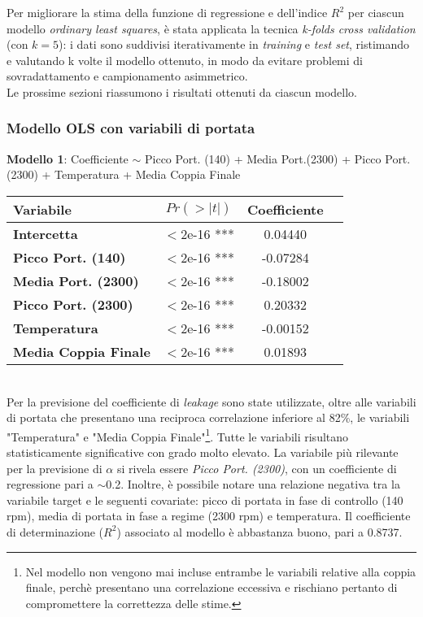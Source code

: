 \documentclass[fleqn,10pt]{SelfArx} %
\begin{document}
Per migliorare la stima della funzione di regressione e dell'indice $R^2$ per ciascun modello \textit{ordinary least squares}, è stata applicata la tecnica \textit{k-folds cross validation} (con $k=5$): i dati sono suddivisi iterativamente in \textit{training} e \textit{test set}, ristimando e valutando k volte il modello ottenuto, in modo da evitare problemi di sovradattamento e campionamento asimmetrico.\\
Le prossime sezioni riassumono i risultati ottenuti da ciascun modello.
\subsubsection{Modello OLS con variabili di portata}
\textbf{Modello 1}: Coefficiente $\sim$  Picco Port. (140) + Media Port.(2300) + Picco Port. (2300) + Temperatura + Media Coppia Finale
{\begin{table}[h] 
\centering
\begin{tabular}[t]{lccc}
\toprule 
Variabile&$Pr(> |t|)$&Coefficiente\\
\midrule 
\textbf{Intercetta}&$<$2e-16 ***&0.04440\\ 
\textbf{Picco Port. (140)}&$<$2e-16 ***&-0.07284\\ 
\textbf{Media Port. (2300)}&$<$2e-16 ***&-0.18002\\ 
\textbf{Picco Port. (2300)}&$<$2e-16 ***&0.20332\\ 
\textbf{Temperatura}&$<$2e-16 ***&-0.00152\\
\textbf{Media Coppia Finale}&$<$2e-16 ***&0.01893\\
\bottomrule 
\end{tabular}
\end{table}}\\
Per la previsione del coefficiente di \textit{leakage} sono state utilizzate, oltre alle variabili di portata che presentano una reciproca correlazione inferiore al 82\%, le variabili "Temperatura" e "Media Coppia Finale"\footnote{\label{cf1}Nel modello non vengono mai incluse entrambe le variabili relative alla coppia finale, perchè presentano una correlazione eccessiva e rischiano pertanto di compromettere la correttezza delle stime.}. Tutte le variabili risultano statisticamente significative con grado molto elevato. La variabile più rilevante per la previsione di $\alpha$ si rivela essere \textit{Picco Port. (2300)}, con un coefficiente di regressione pari a $\sim$0.2. Inoltre, è possibile notare una relazione negativa tra la variabile target e le seguenti covariate: picco di portata in fase di controllo (140 rpm), media di portata in fase a regime (2300 rpm) e temperatura. Il coefficiente di determinazione ($R^2$) associato al modello è abbastanza buono, pari a 0.8737.\\
\end{document}
